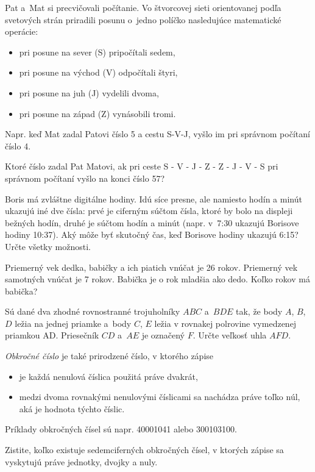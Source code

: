 {%
Pat a~Mat si precvičovali počítanie.
Vo štvorcovej sieti orientovanej podľa svetových strán priradili posunu o~jedno políčko nasledujúce matematické operácie:
\begin{itemize}
\item pri posune na sever (S) pripočítali sedem,
\item pri posune na východ (V) odpočítali štyri,
\item pri posune na juh (J) vydelili dvoma,
\item pri posune na západ (Z) vynásobili tromi.
\end{itemize}
Napr. keď Mat zadal Patovi číslo 5 a cestu S-V-J, vyšlo im pri správnom počítaní číslo 4.

Ktoré číslo zadal Pat Matovi, ak pri ceste S - V - J - Z - Z - J - V - S pri správnom počítaní vyšlo na konci číslo 57?}

{%
Boris má zvláštne digitálne hodiny.
Idú síce presne, ale namiesto hodín a minút ukazujú iné dve čísla:
prvé je ciferným súčtom čísla, ktoré by bolo na displeji bežných hodín,
druhé je súčtom hodín a minút (napr. v~7:30 ukazujú Borisove hodiny 10:37).
Aký môže byť skutočný čas, keď Borisove hodiny ukazujú 6:15? Určte všetky možnosti.}

{%
Priemerný vek dedka, babičky a ich piatich vnúčat je 26 rokov.
Priemerný vek samotných vnúčat je 7 rokov.
Babička je o rok mladšia ako dedo.
Koľko rokov má babička?}

{%
Sú dané dva zhodné rovnostranné trojuholníky $ABC$ a~$BDE$ tak, že body $A$, $B$, $D$ ležia na jednej priamke a~body $C$, $E$ ležia v rovnakej polrovine vymedzenej priamkou AD.
Priesečník $CD$ a~$AE$ je označený $F$.
Určte veľkosť uhla $AFD$.
%
}

{%
{\it Obkročné číslo\/} je také prirodzené číslo, v ktorého zápise
\begin{itemize}
\item je každá nenulová číslica použitá práve dvakrát,
\item medzi dvoma rovnakými nenulovými číslicami sa nachádza práve toľko núl, aká je hodnota týchto číslic.
\end{itemize}
Príklady obkročných čísel sú napr. 40001041 alebo 300103100.

Zistite, koľko existuje sedemciferných obkročných čísel, v ktorých zápise sa vyskytujú práve jednotky, dvojky a nuly.}

